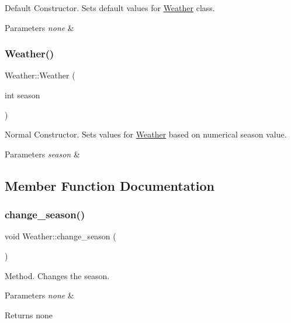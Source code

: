Default Constructor. Sets default values for \hyperlink{class_weather}{Weather} class. 
\begin{DoxyParams}{Parameters}
{\em none} & \\
\hline
\end{DoxyParams}
\mbox{\label{class_weather_a3e640271357cec740bb5c21577a7690b}} 
\subsubsection{\texorpdfstring{Weather()}{Weather()}\hspace{0.1cm}{\footnotesize\ttfamily [2/2]}}
{\footnotesize\ttfamily Weather\+::\+Weather (\begin{DoxyParamCaption}\item[{int}]{season }\end{DoxyParamCaption})}

Normal Constructor. Sets values for \hyperlink{class_weather}{Weather} based on numerical season value. 
\begin{DoxyParams}{Parameters}
{\em season} & \\
\hline
\end{DoxyParams}


\subsection{Member Function Documentation}
\mbox{\label{class_weather_a8104189f3e6a3759c1b02750c8a977c5}} 
\subsubsection{\texorpdfstring{change\+\_\+season()}{change\_season()}}
{\footnotesize\ttfamily void Weather\+::change\+\_\+season (\begin{DoxyParamCaption}{ }\end{DoxyParamCaption})}

Method. Changes the season. 
\begin{DoxyParams}{Parameters}
{\em none} & \\
\hline
\end{DoxyParams}
\begin{DoxyReturn}{Returns}
none 
\end{DoxyReturn}
\mbox{\label{class_weather_aa82920f50a7ee77af1ae8af0ce913d0c}} 
